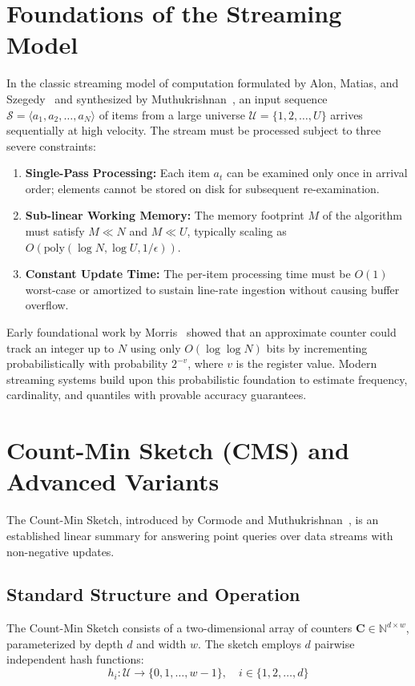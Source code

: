 \section{Foundations of the Streaming Model}

In the classic streaming model of computation formulated by Alon, Matias, and Szegedy~\cite{alon1996space} and synthesized by Muthukrishnan~\cite{muthukrishnan2005data}, an input sequence $\mathcal{S} = \langle a_1, a_2, \dots, a_N \rangle$ of items from a large universe $\mathcal{U} = \{1, 2, \dots, U\}$ arrives sequentially at high velocity. The stream must be processed subject to three severe constraints:
\begin{enumerate}
 \item \textbf{Single-Pass Processing:} Each item $a_t$ can be examined only once in arrival order; elements cannot be stored on disk for subsequent re-examination.
 \item \textbf{Sub-linear Working Memory:} The memory footprint $M$ of the algorithm must satisfy $M \ll N$ and $M \ll U$, typically scaling as $O(\text{poly}(\log N, \log U, 1/\epsilon))$.
 \item \textbf{Constant Update Time:} The per-item processing time must be $O(1)$ worst-case or amortized to sustain line-rate ingestion without causing buffer overflow.
\end{enumerate}

Early foundational work by Morris~\cite{morris1978counting} showed that an approximate counter could track an integer up to $N$ using only $O(\log \log N)$ bits by incrementing probabilistically with probability $2^{-v}$, where $v$ is the register value. Modern streaming systems build upon this probabilistic foundation to estimate frequency, cardinality, and quantiles with provable accuracy guarantees.

\section{Count-Min Sketch (CMS) and Advanced Variants}

The Count-Min Sketch, introduced by Cormode and Muthukrishnan~\cite{cms}, is an established linear summary for answering point queries over data streams with non-negative updates.

\subsection{Standard Structure and Operation}
The Count-Min Sketch consists of a two-dimensional array of counters $\mathbf{C} \in \mathbb{N}^{d \times w}$, parameterized by depth $d$ and width $w$. The sketch employs $d$ pairwise independent hash functions:
\begin{equation}
    h_i : \mathcal{U} \rightarrow \{0, 1, \dots, w - 1\}, \quad i \in \{1, 2, \dots, d\}
\end{equation}

